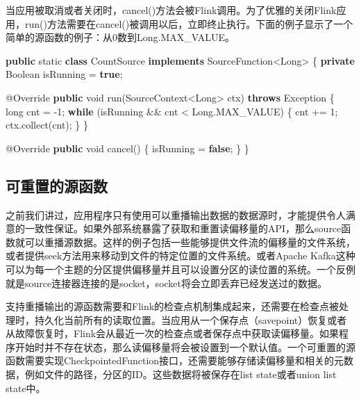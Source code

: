 \documentclass[cn,11pt,chinese]{elegantbook}
\newenvironment{Shaded}{}{}
\newcommand{\AttributeTok}[1]{\textcolor[rgb]{0.49,0.56,0.16}{#1}}
\newcommand{\BuiltInTok}[1]{#1}
\newcommand{\DataTypeTok}[1]{\textcolor[rgb]{0.56,0.13,0.00}{#1}}
\newcommand{\DecValTok}[1]{\textcolor[rgb]{0.25,0.63,0.44}{#1}}
\newcommand{\FunctionTok}[1]{\textcolor[rgb]{0.02,0.16,0.49}{#1}}
\newcommand{\KeywordTok}[1]{\textcolor[rgb]{0.00,0.44,0.13}{\textbf{#1}}}
\newcommand{\NormalTok}[1]{#1}
\begin{document}
当应用被取消或者关闭时，cancel()方法会被Flink调用。为了优雅的关闭Flink应用，run()方法需要在cancel()被调用以后，立即终止执行。下面的例子显示了一个简单的源函数的例子：从0数到Long.MAX\_VALUE。

\begin{Shaded}
\begin{Highlighting}[]
\KeywordTok{public} \DataTypeTok{static} \KeywordTok{class}\NormalTok{ CountSource }\KeywordTok{implements}\NormalTok{ SourceFunction\textless{}}\BuiltInTok{Long}\NormalTok{\textgreater{} \{}
    \KeywordTok{private} \BuiltInTok{Boolean}\NormalTok{ isRunning = }\KeywordTok{true}\NormalTok{;}

    \AttributeTok{@Override}
    \KeywordTok{public} \DataTypeTok{void} \FunctionTok{run}\NormalTok{(SourceContext\textless{}}\BuiltInTok{Long}\NormalTok{\textgreater{} ctx) }\KeywordTok{throws} \BuiltInTok{Exception}\NormalTok{ \{}
        \DataTypeTok{long}\NormalTok{ cnt = {-}}\DecValTok{1}\NormalTok{;}
        \KeywordTok{while}\NormalTok{ (isRunning \&\& cnt \textless{} }\BuiltInTok{Long}\NormalTok{.}\FunctionTok{MAX\_VALUE}\NormalTok{) \{}
\NormalTok{            cnt += }\DecValTok{1}\NormalTok{;}
\NormalTok{            ctx.}\FunctionTok{collect}\NormalTok{(cnt);}
\NormalTok{        \}}
\NormalTok{    \}}

    \AttributeTok{@Override}
    \KeywordTok{public} \DataTypeTok{void} \FunctionTok{cancel}\NormalTok{() \{}
\NormalTok{        isRunning = }\KeywordTok{false}\NormalTok{;}
\NormalTok{    \}}
\NormalTok{\}}
\end{Highlighting}
\end{Shaded}

\hypertarget{ux53efux91cdux7f6eux7684ux6e90ux51fdux6570}{%
\subsection{可重置的源函数}\label{ux53efux91cdux7f6eux7684ux6e90ux51fdux6570}}

之前我们讲过，应用程序只有使用可以重播输出数据的数据源时，才能提供令人满意的一致性保证。如果外部系统暴露了获取和重置读偏移量的API，那么source函数就可以重播源数据。这样的例子包括一些能够提供文件流的偏移量的文件系统，或者提供seek方法用来移动到文件的特定位置的文件系统。或者Apache
Kafka这种可以为每一个主题的分区提供偏移量并且可以设置分区的读位置的系统。一个反例就是source连接器连接的是socket，socket将会立即丢弃已经发送过的数据。

支持重播输出的源函数需要和Flink的检查点机制集成起来，还需要在检查点被处理时，持久化当前所有的读取位置。当应用从一个保存点（savepoint）恢复或者从故障恢复时，Flink会从最近一次的检查点或者保存点中获取读偏移量。如果程序开始时并不存在状态，那么读偏移量将会被设置到一个默认值。一个可重置的源函数需要实现CheckpointedFunction接口，还需要能够存储读偏移量和相关的元数据，例如文件的路径，分区的ID。这些数据将被保存在list
state或者union list state中。
\end{document}
